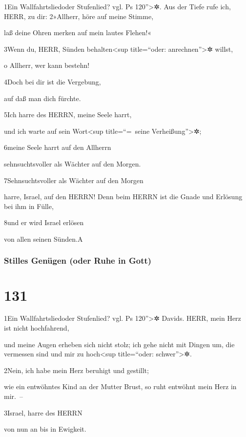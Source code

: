 1Ein Wallfahrtsliedoder Stufenlied? vgl. Ps 120''\textgreater✲. Aus der
Tiefe rufe ich, HERR, zu dir: 2»Allherr, höre auf meine Stimme,

laß deine Ohren merken auf mein lautes Flehen!«

3Wenn du, HERR, Sünden behalten\textless sup title=``oder:
anrechnen''\textgreater✲ willst,

o Allherr, wer kann bestehn!

4Doch bei dir ist die Vergebung,

auf daß man dich fürchte.

5Ich harre des HERRN, meine Seele harrt,

und ich warte auf sein Wort\textless sup title=``=~seine
Verheißung''\textgreater✲;

6meine Seele harrt auf den Allherrn

sehnsuchtsvoller als Wächter auf den Morgen.

7Sehnsuchtsvoller als Wächter auf den Morgen

harre, Israel, auf den HERRN! Denn beim HERRN ist die Gnade und Erlösung
bei ihm in Fülle,

8und er wird Israel erlösen

von allen seinen Sünden.{A}

\hypertarget{stilles-genuxfcgen-oder-ruhe-in-gott}{%
\subsubsection{Stilles Genügen (oder Ruhe in
Gott)}\label{stilles-genuxfcgen-oder-ruhe-in-gott}}

\hypertarget{section-130}{%
\section{131}\label{section-130}}

1Ein Wallfahrtsliedoder Stufenlied? vgl. Ps 120''\textgreater✲ Davids.
HERR, mein Herz ist nicht hochfahrend,

und meine Augen erheben sich nicht stolz; ich gehe nicht mit Dingen um,
die vermessen sind und mir zu hoch\textless sup title=``oder:
schwer''\textgreater✲.

2Nein, ich habe mein Herz beruhigt und gestillt;

wie ein entwöhntes Kind an der Mutter Brust, so ruht entwöhnt mein Herz
in mir.~--

3Israel, harre des HERRN

von nun an bis in Ewigkeit.

